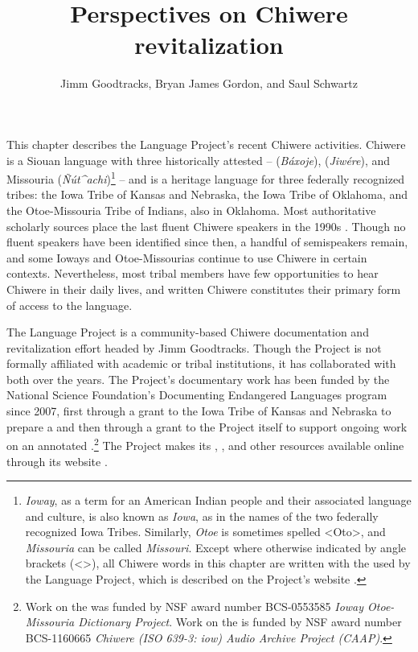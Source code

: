\documentclass[output=paper]{LSP/langsci}
\author{Jimm Goodtracks, Bryan James Gordon, and Saul Schwartz}
\title{Perspectives on {Chiwere} revitalization}
\begin{document}
 
This chapter describes the  Language Project's recent Chiwere  activities. Chiwere is a Siouan language with three historically attested  --  (\emph{Báxoje}),  (\emph{Jiwére}), and Missouria (\emph{\~Nút\^{ }achi})\footnote{\emph{Ioway}, as a term for an American Indian people and their associated language and culture, is also known as \emph{Iowa}, as in the names of the two federally recognized Iowa Tribes. Similarly, \emph{Otoe} is sometimes spelled <Oto>, and \emph{Missouria} can be called \emph{Missouri}. Except where otherwise indicated by angle brackets (<>), all Chiwere words in this chapter are written with the  used by the  Language Project, which is described on the Project's website \citep{GoodtracksND}.} -- and is a heritage language for three federally recognized tribes: the Iowa Tribe of Kansas and Nebraska, the Iowa Tribe of Oklahoma, and the Otoe-Missouria Tribe of Indians, also in Oklahoma. Most authoritative scholarly sources place the last fluent Chiwere speakers in the 1990s \citep{Lewisetal2013, ParksRankin2001}. Though no fluent speakers have been identified since then, a handful of semispeakers remain, and some Ioways and Otoe-Missourias continue to use Chiwere in certain contexts. Nevertheless, most tribal members have few opportunities to hear Chiwere in their daily lives, and written Chiwere constitutes their primary form of access to the language.
 

The  Language Project is a community-based Chiwere documentation and revitalization effort headed by Jimm Goodtracks. Though the Project is not formally affiliated with academic or tribal institutions, it has collaborated with both over the years. The Project's documentary work has been funded by the National Science Foundation's Documenting Endangered Languages program since 2007, first through a grant to the Iowa Tribe of Kansas and Nebraska to prepare a  and then through a grant to the Project itself to support ongoing work on an annotated .\footnote{Work on the  was funded by NSF award number BCS-0553585 \emph{Ioway Otoe-Missouria Dictionary Project}. Work on the  is funded by NSF award number BCS-1160665 \emph{Chiwere (ISO 639-3: iow) Audio Archive Project (CAAP)}.}  The Project makes its , , and other resources available online through its website \citep{GoodtracksND}. 
\end{document}
